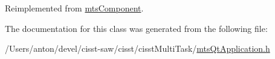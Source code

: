 Reimplemented from \hyperlink{classmts_component_aaf28f0262b44eb6866e10089a02fa6e4}{mts\+Component}.



The documentation for this class was generated from the following file\+:\begin{DoxyCompactItemize}
\item 
/\+Users/anton/devel/cisst-\/saw/cisst/cisst\+Multi\+Task/\hyperlink{mts_qt_application_8h}{mts\+Qt\+Application.\+h}\end{DoxyCompactItemize}
